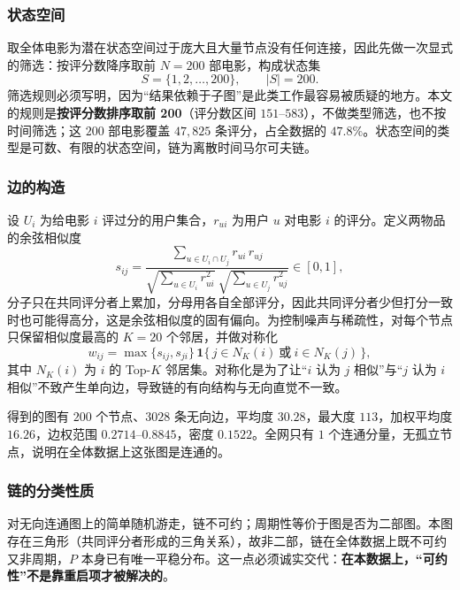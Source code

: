 \documentclass[12pt,a4paper]{ctexart}
\begin{document}
\subsubsection{状态空间}

取全体电影为潜在状态空间过于庞大且大量节点没有任何连接，因此先做一次显式的筛选：按评分数降序取前 $N=200$ 部电影，构成状态集
\[
S=\{1,2,\dots,200\},\qquad |S|=200 .
\]
筛选规则必须写明，因为“结果依赖于子图”是此类工作最容易被质疑的地方。本文的规则是\textbf{按评分数排序取前 200}（评分数区间 $151$--$583$），不做类型筛选，也不按时间筛选；这 $200$ 部电影覆盖 $47{,}825$ 条评分，占全数据的 $47.8\%$。状态空间的类型是可数、有限的状态空间，链为离散时间马尔可夫链。

\subsubsection{边的构造}

设 $U_i$ 为给电影 $i$ 评过分的用户集合，$r_{ui}$ 为用户 $u$ 对电影 $i$ 的评分。定义两物品的余弦相似度
\begin{equation}
s_{ij}=\frac{\sum_{u\in U_i\cap U_j} r_{ui}\,r_{uj}}
{\sqrt{\sum_{u\in U_i} r_{ui}^{2}}\ \sqrt{\sum_{u\in U_j} r_{uj}^{2}}}\in[0,1],
\label{eq:cos}
\end{equation}
分子只在共同评分者上累加，分母用各自全部评分，因此共同评分者少但打分一致时也可能得高分，这是余弦相似度的固有偏向。为控制噪声与稀疏性，对每个节点只保留相似度最高的 $K=20$ 个邻居，并做对称化
\begin{equation}
w_{ij}=\max\{s_{ij},s_{ji}\}\,\mathbf{1}\{\,j\in N_K(i)\ \text{或}\ i\in N_K(j)\,\},
\label{eq:w}
\end{equation}
其中 $N_K(i)$ 为 $i$ 的 Top-$K$ 邻居集。对称化是为了让“$i$ 认为 $j$ 相似”与“$j$ 认为 $i$ 相似”不致产生单向边，导致链的有向结构与无向直觉不一致。

得到的图有 $200$ 个节点、$3028$ 条无向边，平均度 $30.28$，最大度 $113$，加权平均度 $16.26$，边权范围 $0.2714$--$0.8845$，密度 $0.1522$。全网只有 $1$ 个连通分量，无孤立节点，说明在全体数据上这张图是连通的。

\subsubsection{链的分类性质}

对无向连通图上的简单随机游走，链不可约；周期性等价于图是否为二部图。本图存在三角形（共同评分者形成的三角关系），故非二部，链在全体数据上既不可约又非周期，$P$ 本身已有唯一平稳分布。这一点必须诚实交代：\textbf{在本数据上，“可约性”不是靠重启项才被解决的}。
\end{document}
